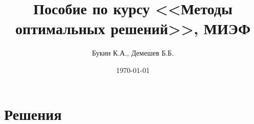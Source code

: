 \documentclass[a4paper,12pt]{article}
\title{Пособие по курсу <<Методы оптимальных решений>>, МИЭФ}
\author{Букин К.А., Демешев Б.Б.}
\date{\today}
\begin{document}
\maketitle %
\tableofcontents


\problemonly


\restoresection
\section{Решения}

\solutiononly

\end{document}

